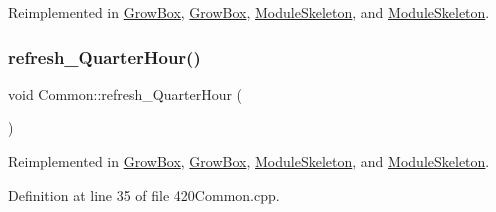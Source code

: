 Reimplemented in \hyperlink{class_grow_box_ac542032f42c8d6eac941ba4d98b73447}{Grow\+Box}, \hyperlink{class_grow_box_ac542032f42c8d6eac941ba4d98b73447}{Grow\+Box}, \hyperlink{class_module_skeleton_ade7e1fee2417a8e23a1f8f31502045ab}{Module\+Skeleton}, and \hyperlink{class_module_skeleton_ade7e1fee2417a8e23a1f8f31502045ab}{Module\+Skeleton}.

\mbox{\label{class_common_aa7222229739c89d441fadd6a40deff89}} 
\subsubsection{\texorpdfstring{refresh\+\_\+\+Quarter\+Hour()}{refresh\_QuarterHour()}\hspace{0.1cm}{\footnotesize\ttfamily [2/2]}}
{\footnotesize\ttfamily void Common\+::refresh\+\_\+\+Quarter\+Hour (\begin{DoxyParamCaption}{ }\end{DoxyParamCaption})\hspace{0.3cm}{\ttfamily [virtual]}}



Reimplemented in \hyperlink{class_grow_box_ac542032f42c8d6eac941ba4d98b73447}{Grow\+Box}, \hyperlink{class_grow_box_ac542032f42c8d6eac941ba4d98b73447}{Grow\+Box}, \hyperlink{class_module_skeleton_ade7e1fee2417a8e23a1f8f31502045ab}{Module\+Skeleton}, and \hyperlink{class_module_skeleton_ade7e1fee2417a8e23a1f8f31502045ab}{Module\+Skeleton}.



Definition at line 35 of file 420\+Common.\+cpp.

